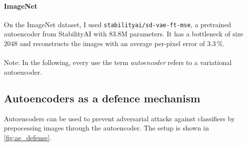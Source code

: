 \documentclass[]{scrarticle}
\renewcommand{\todo}[1]{}
\begin{document}

\paragraph{ImageNet}
On the ImageNet dataset, I used \texttt{stabilityai/sd-vae-ft-mse}, a pretrained autoencoder from StabilityAI
\cite{stabilityai_sdvaeftmse} with $83.8\text{M}$ parameters.
It has a bottleneck of size 2048 and reconstructs the images with an average per-pixel error of $3.3\,\%$.


\paragraph{}Note: In the following, every use the term \textit{autoencoder}
refers to a variational autoencoder.




\subsection{Autoencoders as a defence mechanism}
Autoencoders can be used to prevent adversarial attacks
against classifiers by prepocessing images through the autoencoder.
The setup is shown in \autoref{fig:ae_defense}.
\end{document}
